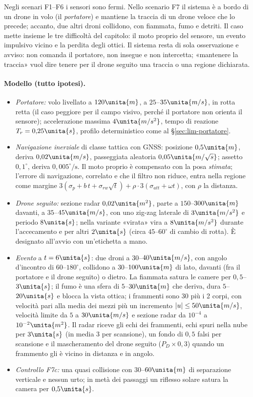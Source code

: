 Negli scenari F1--F6 i sensori sono fermi. Nello scenario F7 il sistema è a bordo di un drone in volo (il \emph{portatore}) e mantiene la traccia di un drone veloce che lo precede; accanto, due altri droni collidono, con fiammata, fumo e detriti. Il caso mette insieme le tre difficoltà del capitolo: il moto proprio del sensore, un evento impulsivo vicino e la perdita degli ottici. Il sistema resta di sola osservazione e avviso: non comanda il portatore, non insegue e non intercetta; «mantenere la traccia» vuol dire tenere per il drone seguito una traccia o una regione dichiarata.

\paragraph{Modello (tutto ipotesi).}
\begin{itemize}
\item \emph{Portatore:} volo livellato a $120\unita{m}$, a $25$--$35\unita{m/s}$, in rotta retta (il caso peggiore per il campo visivo, perché il portatore non orienta il sensore); accelerazione massima $4\unita{m/s^2}$, tempo di reazione $T_r=0{,}25\unita{s}$, profilo deterministico come al \S\ref{sec:lim-portatore}.
\item \emph{Navigazione inerziale} di classe tattica con GNSS: posizione $0{,}5\unita{m}$, deriva $0{,}02\unita{m/s}$, passeggiata aleatoria $0{,}05\unita{m/\sqrt{s}}$; assetto $0{,}1^\circ$, deriva $0{,}005^\circ/\mathrm{s}$. Il moto proprio è compensato con la posa \emph{stimata}; l'errore di navigazione, correlato e che il filtro non riduce, entra nella regione come margine $3(\sigma_p+b\,t+\sigma_{rw}\sqrt t)+\rho\cdot3(\sigma_{att}+\omega t)$, con $\rho$ la distanza.
\item \emph{Drone seguito:} sezione radar $0{,}02\unita{m^2}$, parte a $150$--$300\unita{m}$ davanti, a $35$--$45\unita{m/s}$, con uno zig-zag laterale di $3\unita{m/s^2}$ e periodo $8\unita{s}$; nella variante «virata» vira a $8\unita{m/s^2}$ durante l'accecamento e per altri $2\unita{s}$ (circa $45$--$60^\circ$ di cambio di rotta). È designato all'avvio con un'etichetta a mano.
\item \emph{Evento} a $t=6\unita{s}$: due droni a $30$--$40\unita{m/s}$, con angolo d'incontro di $60$--$180^\circ$, collidono a $30$--$100\unita{m}$ di lato, davanti (fra il portatore e il drone seguito) o dietro. La fiammata satura le camere per $0{,}5$--$3\unita{s}$; il fumo è una sfera di $5$--$30\unita{m}$ che deriva, dura $5$--$20\unita{s}$ e blocca la vista ottica; i frammenti sono 30 più i 2 corpi, con velocità pari alla media dei mezzi più un incremento $|u|\le50\unita{m/s}$, velocità limite da $5$ a $30\unita{m/s}$ e sezione radar da $10^{-4}$ a $10^{-2}\unita{m^2}$. Il radar riceve gli echi dei frammenti, echi spuri nella nube per $3\unita{s}$ (in media 3 per scansione), un fondo di $0{,}5$ falsi per scansione e il mascheramento del drone seguito ($P_D\times0{,}3$) quando un frammento gli è vicino in distanza e in angolo.
\item \emph{Controllo F7c:} una quasi collisione con $30$--$60\unita{m}$ di separazione verticale e nessun urto; in metà dei passaggi un riflesso solare satura la camera per $0{,}5\unita{s}$.
\end{itemize}

